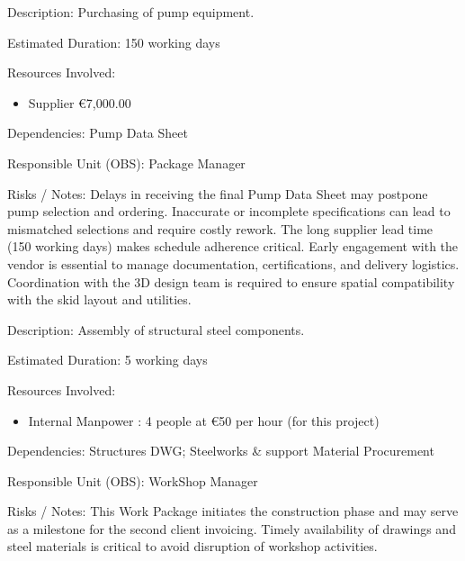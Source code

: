 \begin{tcolorbox}[boxstyle2, title=Pump Procurement]
Description:
Purchasing of pump equipment.

Estimated Duration: 150 working days

Resources Involved:
\begin{itemize}
    \item  Supplier €7,000.00
\end{itemize}

Dependencies:
Pump Data Sheet

Responsible Unit (OBS): Package Manager

Risks / Notes:
Delays in receiving the final Pump Data Sheet may postpone pump selection and ordering.
Inaccurate or incomplete specifications can lead to mismatched selections and require costly rework.
The long supplier lead time (150 working days) makes schedule adherence critical.
Early engagement with the vendor is essential to manage documentation, certifications, and delivery logistics.
Coordination with the 3D design team is required to ensure spatial compatibility with the skid layout and utilities.
\end{tcolorbox}

\begin{tcolorbox}[boxstyle2, title=Structures Prefabrication]
Description:
Assembly of structural steel components.

Estimated Duration: 5 working days

Resources Involved:
\begin{itemize}
    \item  Internal Manpower : 4 people at €50 per hour (for this project)
\end{itemize}

Dependencies:
Structures DWG; Steelworks \& support Material Procurement

Responsible Unit (OBS): WorkShop Manager

Risks / Notes:
This Work Package initiates the construction phase and may serve as a milestone for the second client invoicing. Timely availability of drawings and steel materials is critical to avoid disruption of workshop activities.

\end{tcolorbox}

